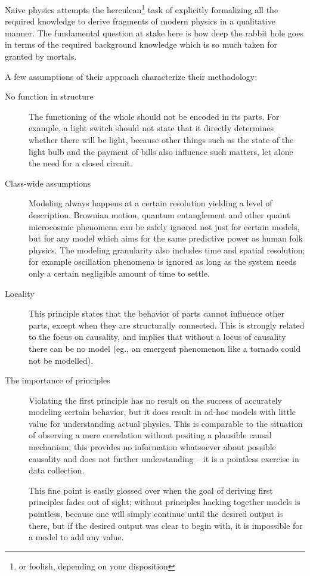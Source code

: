 \documentclass{article} %
\begin{document}
Naive physics attempts the herculean\footnote{or foolish, depending on your
disposition} task of explicitly formalizing all the required knowledge to
derive fragments of modern physics in a qualitative manner. The fundamental
question at stake here is how deep the rabbit hole goes in terms of the
required background knowledge which is so much taken for granted by mortals.

A few assumptions of their approach characterize their methodology:

\begin{description}
	\item[No function in structure]
		The functioning of the whole should not be encoded in its
		parts. For example, a light switch should not state that it
		directly determines whether there will be light, because other
		things such as the state of the light bulb and the payment of
		bills also influence such matters, let alone the need for a
		closed circuit.

	\item[Class-wide assumptions]
		Modeling always happens at a certain resolution yielding a
		level of description. Brownian motion, quantum entanglement
		and other quaint microcosmic phenomena can be safely ignored
		not just for certain models, but for any model which aims for
		the same predictive power as human folk physics. The modeling
		granularity also includes time and spatial resolution; for
		example oscillation phenomena is ignored as long as the system
		needs only a certain negligible amount of time to settle.
	
	\item[Locality]
		This principle states that the behavior of parts cannot
		influence other parts, except when they are structurally
		connected. This is strongly related to the focus on causality,
		and implies that without a locus of causality there can be no
		model (eg., an emergent phenomenon like a tornado could not be
		modelled).

	\item[The importance of principles]
		Violating the first principle has no result on the success
		of accurately modeling certain behavior, but it does result in
		ad-hoc models with little value for understanding actual
		physics. This is comparable to the situation of observing a
		mere correlation without positing a plausible causal mechanism;
		this provides no information whatsoever about possible
		causality and does not further understanding -- it is a
		pointless exercise in data collection.

		This fine point is easily glossed over when the goal of
		deriving first principles fades out of sight; without
		principles hacking together models is pointless, because one
		will simply continue until the desired output is there, but if
		the desired output was clear to begin with, it is impossible
		for a model to add any value.
\end{description}
\end{document}
